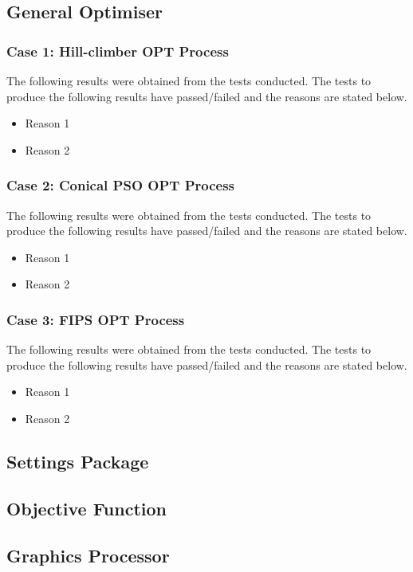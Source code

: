 \documentclass[11pt]{article}
\begin{document}
\subsection{General Optimiser}
\subsubsection{Case 1: Hill-climber OPT Process}
The following results were obtained from the tests conducted. The tests to produce the
following results have passed/failed and the reasons are stated below.

\begin{itemize}
	\item Reason 1
	\item Reason 2
\end{itemize}
\subsubsection{Case 2: Conical PSO OPT Process}
The following results were obtained from the tests conducted. The tests to produce the
following results have passed/failed and the reasons are stated below.

\begin{itemize}
	\item Reason 1
	\item Reason 2
\end{itemize}
\subsubsection{Case 3: FIPS OPT Process}
The following results were obtained from the tests conducted. The tests to produce the
following results have passed/failed and the reasons are stated below.

\begin{itemize}
	\item Reason 1
	\item Reason 2
\end{itemize}
\subsection{Settings Package}
\subsection{Objective Function}
\subsection{Graphics Processor}
\end{document}
